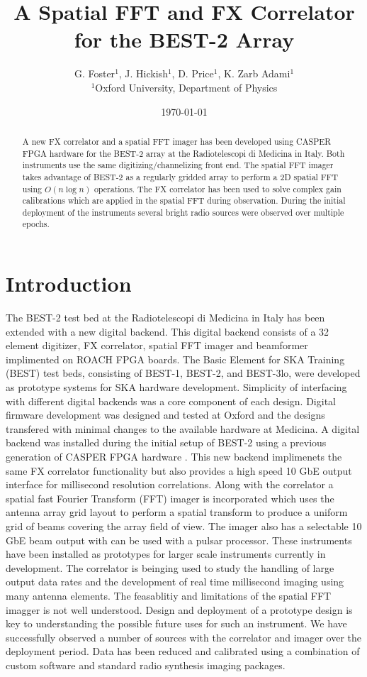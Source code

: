 \documentclass[useAMS,usenatbib,onecolumn]{mn2e}
\title[]{A Spatial FFT and FX Correlator for the BEST-2 Array}
\author[G. Foster, J. Hickish, D. Price and K. Zarb Adami]{G. Foster$^{1}$, J. Hickish$^{1}$, D. Price$^{1}$, K. Zarb Adami$^{1}$\\
$^{1}$Oxford University, Department of Physics}
\begin{document}
\date{\today}

\pagerange{\pageref{firstpage}--\pageref{lastpage}} 

\maketitle

\begin{abstract}
A new FX correlator and a spatial FFT imager has been developed using CASPER FPGA hardware for the BEST-2 array at the Radiotelescopi di Medicina in Italy.
Both instruments use the same digitizing/channelizing front end.
The spatial FFT imager takes advantage of BEST-2 as a regularly gridded array to perform a 2D spatial FFT using $O(n \log n)$ operations.
The FX correlator has been used to solve complex gain calibrations which are applied in the spatial FFT during observation.
During the initial deployment of the instruments several bright radio sources were observed over multiple epochs.
\end{abstract}

\section{Introduction}

The BEST-2 test bed at the Radiotelescopi di Medicina in Italy has been extended with a new digital backend.
This digital backend consists of a 32 element digitizer, FX correlator, spatial FFT imager and beamformer implimented on ROACH FPGA boards.
The Basic Element for SKA Training (BEST) test beds, consisting of BEST-1, BEST-2, and BEST-3lo, were developed as prototype systems for SKA hardware development.
Simplicity of interfacing with different digital backends was a core component of each design.
Digital firmware development was designed and tested at Oxford and the designs transfered with minimal changes to the available hardware at Medicina.
A digital backend was installed during the initial setup of BEST-2 using a previous generation of CASPER FPGA hardware \citep{}.
This new backend implimenets the same FX correlator functionality but also provides a high speed 10 GbE output interface for millisecond resolution correlations.
Along with the correlator a spatial fast Fourier Transform (FFT) imager is incorporated which uses the antenna array grid layout to perform a spatial transform to produce a uniform grid of beams covering the array field of view.
The imager also has a selectable 10 GbE beam output with can be used with a pulsar processor.
These instruments have been installed as prototypes for larger scale instruments currently in development.
The correlator is beinging used to study the handling of large output data rates and the development of real time millisecond imaging using many antenna elements.
The feasablitiy and limitations of the spatial FFT imagger is not well understood.
Design and deployment of a prototype design is key to understanding the possible future uses for such an instrument.
We have successfully observed a number of sources with the correlator and imager over the deployment period.
Data has been reduced and calibrated using a combination of custom software and standard radio synthesis imaging packages.
\end{document}
